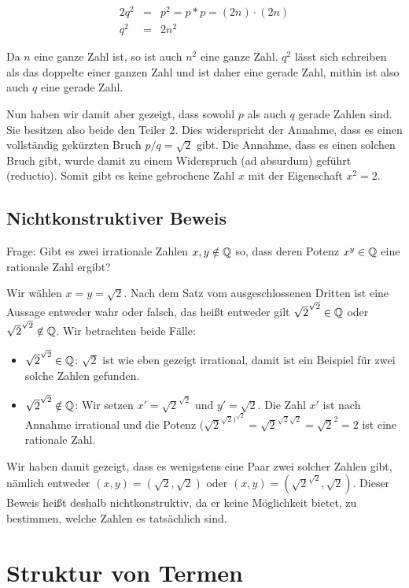 \begin{eqnarray}
	2q^2 & = & p^2 = p * p = (2n) \cdot (2n) \\
	q^2 & = & 2 n^2
\end{eqnarray}
	
Da $n$ eine ganze Zahl ist, so ist auch $n^2$ eine ganze Zahl. $q^2$ lässt sich schreiben als das doppelte einer ganzen Zahl und ist daher eine gerade Zahl, mithin ist also auch $q$ eine gerade Zahl.

Nun haben wir damit aber gezeigt, dass sowohl $p$ als auch $q$ gerade Zahlen sind. Sie besitzen also beide den Teiler $2$. Dies widerspricht der Annahme, dass es einen vollständig gekürzten Bruch $p / q = \sqrt{2}$ gibt. Die Annahme, dass es einen solchen Bruch gibt, wurde damit zu einem Widerspruch (ad absurdum) geführt (reductio). Somit gibt es keine gebrochene Zahl $x$ mit der Eigenschaft $x^2=2$.

\subsection{Nichtkonstruktiver Beweis}

Frage: Gibt es zwei irrationale Zahlen $x,y\notin \mathbb{Q}$ so, dass deren Potenz $x^y\in \mathbb{Q}$ eine rationale Zahl ergibt?

Wir wählen $x=y=\sqrt{2}$. Nach dem Satz vom ausgeschlossenen Dritten ist eine Aussage entweder wahr oder falsch, das heißt entweder gilt $\sqrt{2}^{\sqrt{2}} \in \mathbb{Q}$ oder $\sqrt{2}^{\sqrt{2}}\notin\mathbb{Q}$. Wir betrachten beide Fälle:

\begin{itemize}
	\item $\sqrt{2}^{\sqrt{2}}\in\mathbb{Q}$: $\sqrt{2}$ ist wie eben gezeigt irrational, damit ist ein Beispiel für zwei solche Zahlen gefunden.

	\item $\sqrt{2}^{\sqrt{2}}\notin\mathbb{Q}$: Wir setzen $x' = \sqrt{2}^{\sqrt{2}}$ und $y'=\sqrt{2}$. Die Zahl $x'$ ist nach Annahme irrational und die Potenz $(\sqrt{2}^{\sqrt{2})^{\sqrt{2}}} = \sqrt{2}^{\sqrt{2}\sqrt{2}} = \sqrt{2}^2 = 2$ ist eine rationale Zahl.
\end{itemize}

Wir haben damit gezeigt, dass es wenigstens eine Paar zwei solcher Zahlen gibt, nämlich entweder $(x,y) = (\sqrt{2}, \sqrt{2})$ oder $(x,y) = (\sqrt{2}^{\sqrt{2}}, \sqrt{2})$. Dieser Beweis heißt deshalb nichtkonstruktiv, da er keine Möglichkeit bietet, zu bestimmen, welche Zahlen es tatsächlich sind.

\section{Struktur von Termen}


